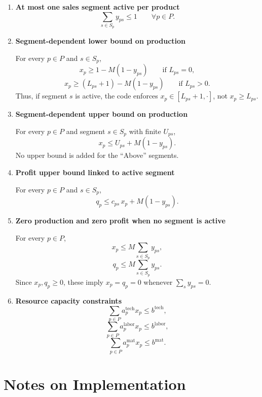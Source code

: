 \begin{enumerate}
    \item \textbf{At most one sales segment active per product}
    \[
    \sum_{s\in S_p} y_{ps} \le 1
    \qquad \forall p\in P.
    \]

    \item \textbf{Segment-dependent lower bound on production}

    For every \(p\in P\) and \(s\in S_p\),
    \[
    x_p \ge 1 - M(1-y_{ps})
    \qquad \text{if } L_{ps}=0,
    \]
    \[
    x_p \ge (L_{ps}+1) - M(1-y_{ps})
    \qquad \text{if } L_{ps}>0.
    \]
    Thus, if segment \(s\) is active, the code enforces \(x_p\in [L_{ps}+1,\cdot]\), not \(x_p\ge L_{ps}\).

    \item \textbf{Segment-dependent upper bound on production}

    For every \(p\in P\) and segment \(s\in S_p\) with finite \(U_{ps}\),
    \[
    x_p \le U_{ps} + M(1-y_{ps}).
    \]
    No upper bound is added for the ``Above'' segments.

    \item \textbf{Profit upper bound linked to active segment}

    For every \(p\in P\) and \(s\in S_p\),
    \[
    q_p \le c_{ps}\,x_p + M(1-y_{ps}).
    \]

    \item \textbf{Zero production and zero profit when no segment is active}

    For every \(p\in P\),
    \[
    x_p \le M\sum_{s\in S_p} y_{ps},
    \]
    \[
    q_p \le M\sum_{s\in S_p} y_{ps}.
    \]
    Since \(x_p,q_p\ge 0\), these imply \(x_p=q_p=0\) whenever \(\sum_s y_{ps}=0\).

    \item \textbf{Resource capacity constraints}
    \[
    \sum_{p\in P} a^{\text{tech}}_p x_p \le b^{\text{tech}},
    \]
    \[
    \sum_{p\in P} a^{\text{labor}}_p x_p \le b^{\text{labor}},
    \]
    \[
    \sum_{p\in P} a^{\text{mat}}_p x_p \le b^{\text{mat}}.
    \]
\end{enumerate}

\section*{Notes on Implementation}

